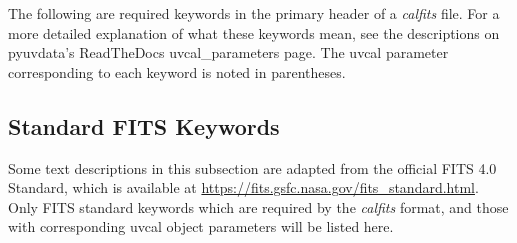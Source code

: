 \documentclass[11pt, oneside, english]{article}   	%
\begin{document}
The following are required keywords in the primary header of a \emph{calfits} file.
For a more detailed explanation of what these keywords mean, see the descriptions on pyuvdata's ReadTheDocs uvcal\_parameters page. The uvcal parameter corresponding to each keyword is noted in parentheses. 
\subsection{Standard FITS Keywords}
Some text descriptions in this subsection are adapted from the official FITS 4.0 Standard, which is available at \url{https://fits.gsfc.nasa.gov/fits_standard.html}.
Only FITS standard keywords which are required by the \emph{calfits} format, and those with corresponding uvcal object parameters will be listed here.
\end{document}
